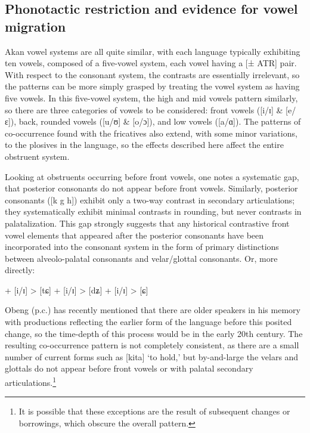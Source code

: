 \documentclass[output=paper,colorlinks,citecolor=brown]{langscibook}
\begin{document}
\subsection{Phonotactic restriction and evidence for vowel migration }

Akan vowel systems are all quite similar, with each language typically exhibiting ten vowels, composed of a five-vowel system, each vowel having a [± ATR] pair. With respect to the consonant system, the  contrasts are essentially irrelevant, so the patterns can be more simply grasped by treating the vowel system as having five vowels. In this five-vowel system, the high and mid vowels pattern similarly, so there are three categories of vowels to be considered: front vowels ([i/ɪ] \& [e/ɛ]), back, rounded vowels ([u/ʊ] \& [o/ɔ]), and low vowels ([a/ɑ]). The patterns of co-occurrence found with the fricatives also extend, with some minor variations, to the plosives in the language, so the effects described here affect the entire obstruent system. 

Looking at obstruents occurring before front vowels, one notes a systematic gap, that posterior consonants do not appear before front vowels. Similarly, posterior consonants ([k g h]) exhibit only a two-way contrast in secondary articulations; they systematically exhibit minimal contrasts in rounding, but never contrasts in palatalization. This gap strongly suggests that any historical contrastive front vowel elements that appeared after the posterior consonants have been incorporated into the consonant system in the form of primary distinctions between alveolo-palatal consonants and velar/glottal consonants. Or, more directly: \newline

\indent [k] + [i/ɪ] > [tɕ] \newline
\indent [g] + [i/ɪ] > [dʑ] \newline
\indent [h] + [i/ɪ] > [ɕ] \newline

\begin{sloppypar}
Obeng (p.c.) has recently mentioned that there are older speakers in his memory with productions reflecting the earlier form of the language before this posited change, so the time-depth of this process would be in the early 20th century. The resulting co-occurrence pattern is not completely consistent, as there are a small number of current forms such as [kita] ‘to hold,’ but by-and-large the velars and glottals do not appear before front vowels or with palatal secondary articulations.\footnote{It is possible that these exceptions are the result of subsequent changes or borrowings, which obscure the overall pattern.}
\end{sloppypar}
\end{document}
